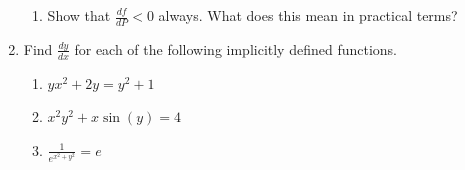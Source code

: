 \documentclass[12pt]{article}
\begin{document}
\begin{enumerate}
\begin{enumerate}
	\item Show that $\frac{df}{dP} < 0$ always. What does this mean in practical terms?
	\vfill
	\end{enumerate}
	
\item Find $\displaystyle \frac{dy}{dx}$ for each of the following implicitly defined functions.

	\begin{enumerate}
	\item $\displaystyle yx^2 + 2y = y^2 + 1$
	\vfill
	
	\item $\displaystyle x^2y^2 + x\sin{(y)} = 4$
	\vfill
	
	\item $\displaystyle \frac{1}{e^{x^2 + y^2}} = e$	
	\vfill	
	\end{enumerate}
	

\end{enumerate}
\end{document}
